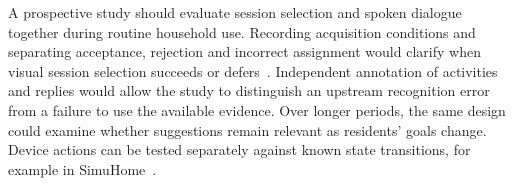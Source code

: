 \documentclass[a4paper,twoside]{article}
\begin{document}
A prospective study should evaluate session selection and spoken dialogue together during routine household use. Recording acquisition conditions and separating acceptance, rejection and incorrect assignment would clarify when visual session selection succeeds or defers~\cite{grother2019frvt}. Independent annotation of activities and replies would allow the study to distinguish an upstream recognition error from a failure to use the available evidence. Over longer periods, the same design could examine whether suggestions remain relevant as residents' goals change. Device actions can be tested separately against known state transitions, for example in SimuHome~\cite{seo2026simuhome}.


{\small
}
\end{document}
